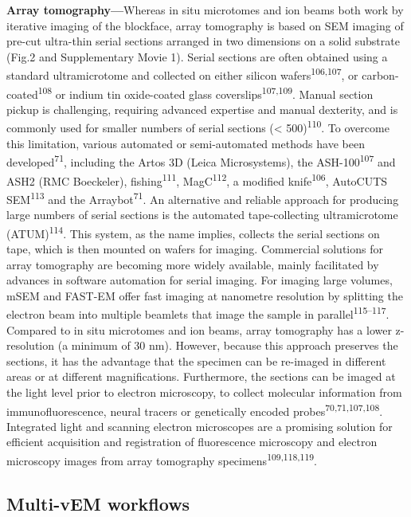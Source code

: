 \documentclass{article}
\begin{document}
\textbf{Array tomography—}Whereas in situ microtomes and ion beams both work by iterative imaging of the blockface, array tomography is based on SEM imaging of pre-cut ultra-thin serial sections arranged in two dimensions on a solid substrate (Fig.2 and Supplementary Movie 1). Serial sections are often obtained using a standard ultramicrotome and collected on either silicon wafers\textsuperscript{106,107}, or carbon-coated\textsuperscript{108} or indium tin oxide-coated glass coverslips\textsuperscript{107,109}. Manual section pickup is challenging, requiring advanced expertise and manual dexterity, and is commonly used for smaller numbers of serial sections (< 500)\textsuperscript{110}. To overcome this limitation, various automated or semi-automated methods have been developed\textsuperscript{71}, including the Artos 3D (Leica Microsystems), the ASH-100\textsuperscript{107} and ASH2 (RMC Boeckeler), fishing\textsuperscript{111}, MagC\textsuperscript{112}, a modified knife\textsuperscript{106}, AutoCUTS SEM\textsuperscript{113} and the Arraybot\textsuperscript{71}. An alternative and reliable approach for producing large numbers of serial sections is the automated tape-collecting ultramicrotome (ATUM)\textsuperscript{114}. This system, as the name implies, collects the serial sections on tape, which is then mounted on wafers for imaging. Commercial solutions for array tomography are becoming more widely available, mainly facilitated by advances in software automation for serial imaging. For imaging large volumes, mSEM and FAST-EM offer fast imaging at nanometre resolution by splitting the electron beam into multiple beamlets that image the sample in parallel\textsuperscript{115–117}. Compared to in situ microtomes and ion beams, array tomography has a lower z-resolution (a minimum of 30 nm). However, because this approach preserves the sections, it has the advantage that the specimen can be re-imaged in different areas or at different magnifications. Furthermore, the sections can be imaged at the light level prior to electron microscopy, to collect molecular information from immunofluorescence, neural tracers or genetically encoded probes\textsuperscript{70,71,107,108}. Integrated light and scanning electron microscopes are a promising solution for efficient acquisition and registration of fluorescence microscopy and electron microscopy images from array tomography specimens\textsuperscript{109,118,119}.

\subsection*{Multi-vEM workflows}
\end{document}
